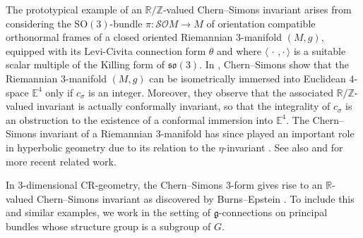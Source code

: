 \documentclass[british,11pt,a4paper]{amsart}
\numberwithin{equation}{section}
\renewcommand\frak{\mathfrak}
\newcommand{\B}[2]{\langle#1,#2\rangle}
\newcommand{\Z}{\mathbb{Z}}
\newcommand*{\R}{\mathbb{R}}
\numberwithin{theorem}{section}
\theoremstyle{definition}
\theoremstyle{remark}
\begin{document}
The prototypical example of an $\R/\Z$-valued Chern--Simons invariant arises from considering the $\mathrm{SO}(3)$-bundle $\pi : \mathcal{SO}M \to M$ of orientation compatible orthonormal frames of a closed oriented Riemannian $3$-manifold $(M,g)$, equipped with its Levi-Civita connection form $\theta$ and where $\B{\,\cdot\,}{\cdot\,}$ is a suitable scalar multiple of the Killing form of $\mathfrak{so}(3)$. In \cite{MR0353327}, Chern--Simons show that the Riemannian $3$-manifold $(M,g)$ can be isometrically immersed into Euclidean $4$-space $\mathbb{E}^4$ only if $c_{\sigma}$ is an integer. Moreover, they observe that the associated $\R/\Z$-valued invariant is actually conformally invariant, so that the integrality of $c_{\sigma}$ is an obstruction to the existence of a conformal immersion into $\mathbb{E}^4$. The Chern--Simons invariant of a Riemannian $3$-manifold has since played an important role in hyperbolic geometry due to its relation to the $\eta$-invariant \cite{MR807069}. See also \cite{MR3228423} and \cite{MR3159164} for more recent related work.

In $3$-dimensional CR-geometry, the Chern--Simons $3$-form gives rise to an
$\R$-valued Chern--Simons invariant as discovered by Burns--Epstein
\cite{MR0936085}. To include this and similar examples, we work in the setting of
$\frak g$-connections on principal bundles whose structure group is a subgroup of
$G$.
\end{document}
